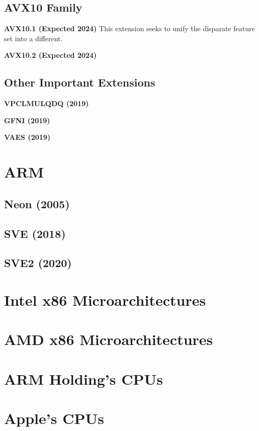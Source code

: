 \subsection{AVX10 Family}

\textbf{AVX10.1 (Expected 2024)} This extension seeks to unify the disparate
feature set into a different. 

\textbf{AVX10.2 (Expected 2024)}

\subsection{Other Important Extensions}
\textbf{VPCLMULQDQ (2019)} 

\textbf{GFNI (2019)} 

\textbf{VAES (2019)} 

\section{ARM}
\subsection{Neon (2005)}

\subsection{SVE (2018)}

\subsection{SVE2 (2020)}

\section{Intel x86 Microarchitectures}
\section{AMD x86 Microarchitectures}
\section{ARM Holding's CPUs}
\section{Apple's CPUs}
